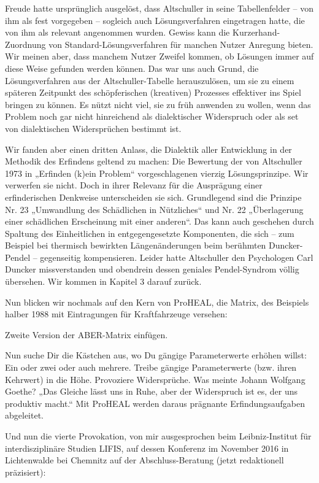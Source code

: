\documentclass[12pt,a4paper]{article}
\begin{document}
Freude hatte ursprünglich ausgelöst, dass Altschuller in seine Tabellenfelder –
von ihm als fest vorgegeben -- sogleich auch Lösungsverfahren eingetragen hatte,
die von ihm als relevant angenommen wurden. Gewiss kann die
Kurzerhand-Zuordnung von Standard-Lösungsverfahren für manchen Nutzer Anregung
bieten. Wir meinen aber, dass manchem Nutzer Zweifel kommen, ob Lösungen immer
auf diese Weise gefunden werden können. Das war uns auch Grund, die
Lösungsverfahren aus der Altschuller-Tabelle herauszulösen, um sie zu einem
späteren Zeitpunkt des schöpferischen (kreativen) Prozesses effektiver ins
Spiel bringen zu können. Es nützt nicht viel, sie zu früh anwenden zu wollen,
wenn das Problem noch gar nicht hinreichend als dialektischer Widerspruch oder
als set von dialektischen Widersprüchen bestimmt ist.

Wir fanden aber einen dritten Anlass, die Dialektik aller Entwicklung in der
Methodik des Erfindens geltend zu machen: Die Bewertung der von Altschuller
1973 in „Erfinden (k)ein Problem“ vorgeschlagenen vierzig Lösungsprinzipe. Wir
verwerfen sie nicht. Doch in ihrer Relevanz für die Ausprägung einer
erfinderischen Denkweise unterscheiden sie sich. Grundlegend sind die Prinzipe
Nr. 23 „Umwandlung des Schädlichen in Nützliches“ und Nr. 22 „Überlagerung
einer schädlichen Erscheinung mit einer anderen“. Das kann auch geschehen durch
Spaltung des Einheitlichen in entgegengesetzte Komponenten, die sich – zum
Beispiel bei thermisch bewirkten Längenänderungen beim berühmten Duncker-Pendel
-- gegenseitig kompensieren. Leider hatte Altschuller den Psychologen Carl
Duncker missverstanden und obendrein dessen geniales Pendel-Syndrom völlig
übersehen. Wir kommen in Kapitel 3 darauf zurück.

Nun blicken wir nochmals auf den Kern von ProHEAL, die Matrix, des Beispiels
halber 1988 mit Eintragungen für Kraftfahrzeuge versehen:
\begin{center}
  Zweite Version der ABER-Matrix einfügen.
\end{center}
Nun suche Dir die Kästchen aus, wo Du gängige Parameterwerte erhöhen willst:
Ein oder zwei oder auch mehrere. Treibe gängige Parameterwerte (bzw. ihren
Kehrwert) in die Höhe. Provoziere Widersprüche. Was meinte Johann Wolfgang
Goethe? „Das Gleiche lässt uns in Ruhe, aber der Widerspruch ist es, der uns
produktiv macht.“ Mit ProHEAL werden daraus prägnante Erfindungsaufgaben
abgeleitet.

Und nun die vierte Provokation, von mir ausgesprochen beim Leibniz-Institut für
interdisziplinäre Studien LIFIS, auf dessen Konferenz im November 2016 in
Lichtenwalde bei Chemnitz auf der Abschluss-Beratung (jetzt redaktionell
präzisiert):
\end{document}
